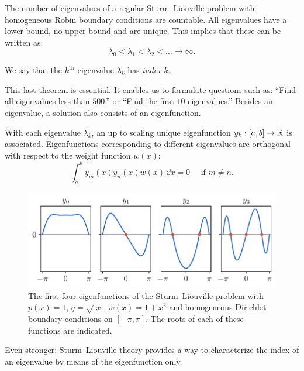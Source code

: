 \begin{theorem}\label{the:c2_slp_countable}
    The number of eigenvalues of a regular Sturm--Liouville problem with homogeneous Robin boundary conditions are countable. All eigenvalues have a lower bound, no upper bound and are unique. This implies that these can be written as:
    $$
        \lambda_0 < \lambda_1 < \lambda_2 < \dots \to \infty \text{.}
    $$

    We say that the $k^{\text{th}}$ eigenvalue $\lambda_k$ has \emph{index} $k$.
\end{theorem}

This last theorem is essential. It enables us to formulate questions such as: ``Find all eigenvalues less than $500$.'' or ``Find the first $10$ eigenvalues.'' Besides an eigenvalue, a solution also consists of an eigenfunction.

\begin{theorem}
    With each eigenvalue $\lambda_k$, an up to scaling unique eigenfunction $y_k : [a, b] \to \mathbb{R}$ is associated. Eigenfunctions corresponding to different eigenvalues are orthogonal with respect to the weight function $w(x)$:
    $$
        \int_a^b y_m(x) y_n(x) w(x) \, \dd x = 0 \quad \text{ if $m \neq n$.}
    $$
\end{theorem}

\begin{figure}
    \begin{center}
        \includegraphics[width=\textwidth]{img/chapter2/slp_count_roots.pdf}
    \end{center}
    \caption{The first four eigenfunctions of the Sturm--Liouville problem with $p(x) = 1$, $q = \sqrt{|x|}$, $w(x) = 1+x^2$ and homogeneous Dirichlet boundary conditions on $[-\pi, \pi]$. The roots of each of these functions are indicated.}
    \label{fig:c2_sturm_liovuille_k_roots}
\end{figure}

Even stronger: Sturm--Liouville theory provides a way to characterize the index of an eigenvalue by means of the eigenfunction only.

